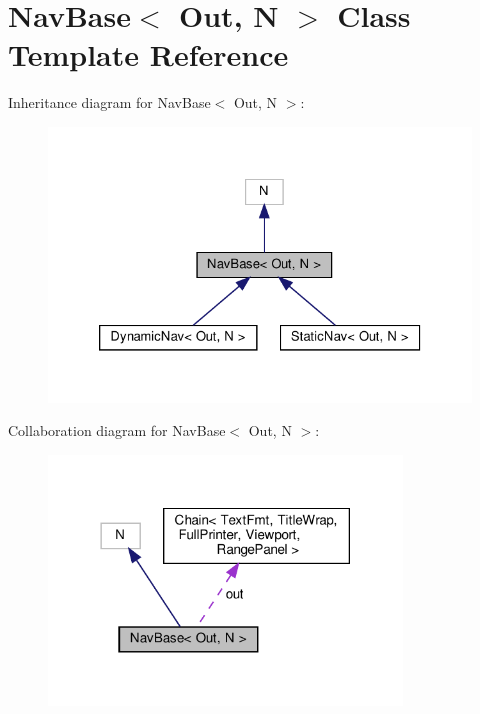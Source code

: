 \hypertarget{classNavBase}{}\section{Nav\+Base$<$ Out, N $>$ Class Template Reference}
\label{classNavBase}


Inheritance diagram for Nav\+Base$<$ Out, N $>$\+:\nopagebreak
\begin{figure}[H]
\begin{center}
\leavevmode
\includegraphics[width=326pt]{classNavBase__inherit__graph}
\end{center}
\end{figure}


Collaboration diagram for Nav\+Base$<$ Out, N $>$\+:\nopagebreak
\begin{figure}[H]
\begin{center}
\leavevmode
\includegraphics[width=266pt]{classNavBase__coll__graph}
\end{center}
\end{figure}
